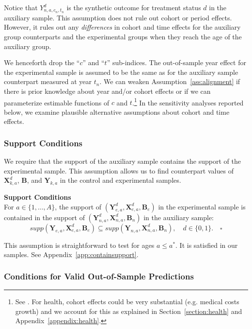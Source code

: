 Notice that $Y^d_{n,a,{c_n},{t_n}}$ is the synthetic outcome for treatment status $d$ in the auxiliary sample. This assumption does not rule out cohort or period effects. However, it rules out any \emph{differences} in cohort and time effects for the auxiliary group counterparts and the experimental groups when they reach the age of the auxiliary group.

We henceforth drop the ``$c$'' and ``$t$'' sub-indices. The out-of-sample year effect for the experimental sample is assumed to be the same as for the auxiliary sample counterpart measured at year $t_n$. We can weaken Assumption~\ref{ass:alignment} if there is prior knowledge about year and/or cohort effects or if we can parameterize estimable functions of $c$ and $t$.\footnote{See \cite{Heckman_Robb_1985_JE}. For health, cohort effects could be very substantial (e.g. medical costs growth) and we account for this as explained in Section~\ref{section:health} and  Appendix~\ref{appendix:health}.} In the sensitivity analyses reported below, we examine plausible alternative assumptions about cohort and time effects.

\subsubsection{Support Conditions}

We require that the support of the auxiliary sample contains the support of the experimental sample. This assumption allows us to find counterpart values of $\bm{X}^d_{k,a}$, $\bm{B}$, and $\bm{Y}_{k,a}$ in the control and experimental samples.

\onehalfspacing
\begin{assumption} \label{ass:contain} \textbf{Support Conditions} \\
For $a \in \{ 1, \ldots, A \}$, the support of $\left( \bm{Y}^d_{e,a}, \bm{X}^d_{e,a}, \bm{B}_e \right)$ in the experimental sample is contained in the support of $\left( \bm{Y}^d_{n,a}, \bm{X}^d_{n,a}, \bm{B}_n \right)$ in the auxiliary sample:
\begin{equation}
supp( \bm{Y}_{e,a}, \bm{X}^d_{e,a}, \bm{B}_e ) \subseteq supp( \bm{Y}_{n,a}, \bm{X}^d_{n,a}, \bm{B}_n ), \quad d \in \{0,1\}. \quad \square
\end{equation}
\end{assumption}
\doublespacing
This assumption is straightforward to test for ages $a\leq a^\ast$. It is satisfied in our samples. See  Appendix~\ref{app:containsupport}.

\subsubsection{Conditions for Valid Out-of-Sample Predictions}

